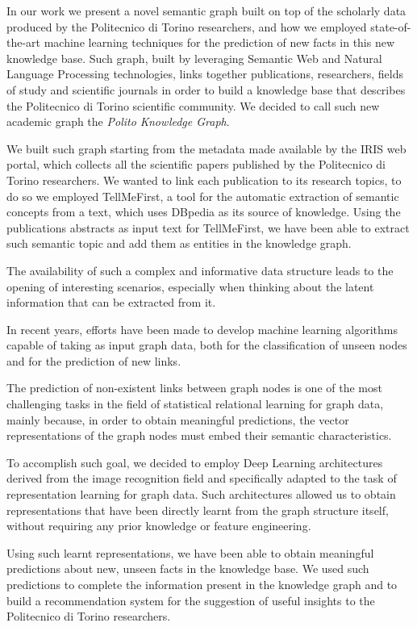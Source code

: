 \documentclass[%
    corpo=13.5pt,
    twoside,
    oldstyle,
    tipotesi=magistrale,
    greek,
    evenboxes
]{toptesi}
\begin{document}
In our work we present a novel semantic graph built on top of the
scholarly data produced by the Politecnico di Torino researchers, and how we
employed state-of-the-art machine learning techniques for the prediction
of new facts in this new knowledge base.
Such graph, built by leveraging Semantic Web and Natural Language Processing 
technologies, links together publications, researchers, fields of study 
and scientific journals in order to build a knowledge base that describes 
the Politecnico di Torino scientific community.
We decided to call such new academic graph the \emph{Polito Knowledge Graph}.

We built such graph starting from the metadata made available by the 
IRIS web portal, which collects all the scientific papers published by 
the Politecnico di Torino researchers.
We wanted to link each publication to its research topics, to do so 
we employed TellMeFirst, a tool for the automatic extraction of semantic 
concepts from a text, which uses DBpedia as its source of knowledge.
Using the publications abstracts as input text for TellMeFirst, we
have been able to extract such semantic topic and add them as 
entities in the knowledge graph.
\newline

The availability of such a complex and informative data structure leads
to the opening of interesting scenarios, especially when thinking about
the latent information that can be extracted from it.

In recent years, efforts have been made to develop machine learning 
algorithms capable of taking as input graph data, both for the classification 
of unseen nodes and for the prediction of new links.

The prediction of non-existent links between graph nodes is one of the
most challenging tasks in the field of statistical relational learning for graph 
data, mainly because, in order to obtain meaningful predictions, the vector 
representations of the graph nodes must embed their semantic characteristics.





To accomplish such goal, we decided to employ Deep Learning architectures derived
from the image recognition field and specifically adapted to the task of
representation learning for graph data.
Such architectures allowed us to obtain representations that have been
directly learnt from the graph structure itself, without requiring any prior
knowledge or feature engineering.

Using such learnt representations, we have been able to obtain meaningful
predictions about new, unseen facts in the knowledge base.
We used such predictions to complete the information present in the
knowledge graph and to build a recommendation system for the suggestion of useful
insights to the Politecnico di Torino researchers.
\end{document}
